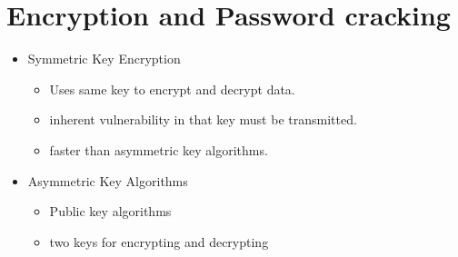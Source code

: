 \documentclass[12pt]{article}
\newenvironment{statement}[1]
{\begin{mdframed}[linewidth=0.6pt]
        \textsc{Statement #1:}

}
    {\end{mdframed}}
\begin{document}
\section{Encryption and Password cracking}
\begin{itemize}
	\item Symmetric Key Encryption
		\begin{itemize}
			\item Uses same key to encrypt and decrypt data.
			\item inherent vulnerability in that key must be transmitted.
			\item faster than asymmetric key algorithms.
		\end{itemize}
	\item Asymmetric Key Algorithms
		\begin{itemize}
			\item Public key algorithms
			\item two keys for encrypting and decrypting
		\end{itemize}
\end{itemize}

%
%
%
\end{document}
